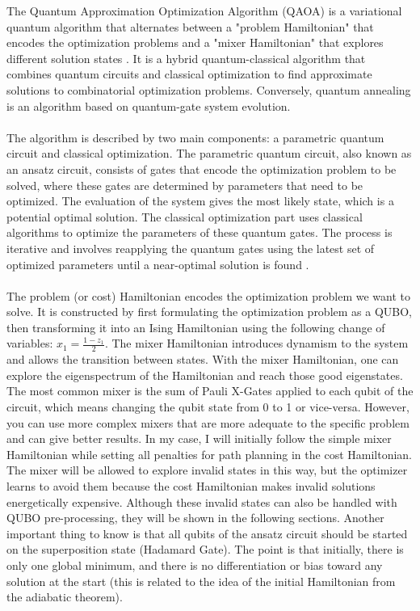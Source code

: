 \documentclass[11pt]{article}
\begin{document}
The Quantum Approximation Optimization Algorithm (QAOA) is a variational quantum algorithm that alternates between a "problem Hamiltonian" that encodes the optimization problems and a "mixer Hamiltonian" that explores different solution states \cite{farhi2014quantumapproximateoptimizationalgorithm}. It is a hybrid quantum-classical algorithm that combines quantum circuits and classical optimization to find approximate solutions to combinatorial optimization problems. Conversely, quantum annealing is an algorithm based on quantum-gate system evolution.\\
\\
The algorithm is described by two main components: a parametric quantum circuit and classical optimization. The parametric quantum circuit, also known as an ansatz circuit, consists of gates that encode the optimization problem to be solved, where these gates are determined by parameters that need to be optimized. The evaluation of the system gives the most likely state, which is a potential optimal solution. The classical optimization part uses classical algorithms to optimize the parameters of these quantum gates. The process is iterative and involves reapplying the quantum gates using the latest set of optimized parameters until a near-optimal solution is found \cite{QAOA}.\\
\\
The problem (or cost) Hamiltonian encodes the optimization problem we want to solve. It is constructed by first formulating the optimization problem as a QUBO, then transforming it into an Ising Hamiltonian using the following change of variables: \(x_1=\frac{1-z_1}2\). The mixer Hamiltonian introduces dynamism to the system and allows the transition between states. With the mixer Hamiltonian, one can explore the eigenspectrum of the Hamiltonian and reach those good eigenstates. The most common mixer is the sum of Pauli X-Gates applied to each qubit of the circuit, which means changing the qubit state from 0 to 1 or vice-versa. However, you can use more complex mixers that are more adequate to the specific problem and can give better results. In my case, I will initially follow the simple mixer Hamiltonian while setting all penalties for path planning in the cost Hamiltonian. The mixer will be allowed to explore invalid states in this way, but the optimizer learns to avoid them because the cost Hamiltonian makes invalid solutions energetically expensive. Although these invalid states can also be handled with QUBO pre-processing, they will be shown in the following sections. Another important thing to know is that all qubits of the ansatz circuit should be started on the superposition state (Hadamard Gate). The point is that initially, there is only one global minimum, and there is no differentiation or bias toward any solution at the start (this is related to the idea of the initial Hamiltonian from the adiabatic theorem).\\
\end{document}
